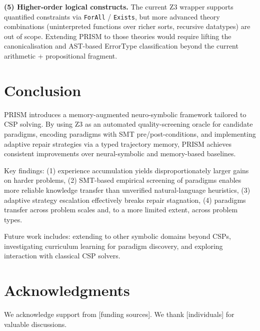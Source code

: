 \textbf{(5) Higher-order logical constructs.} The current Z3 wrapper supports quantified constraints via \texttt{ForAll} / \texttt{Exists}, but more advanced theory combinations (uninterpreted functions over richer sorts, recursive datatypes) are out of scope. Extending PRISM to those theories would require lifting the canonicalisation and AST-based ErrorType classification beyond the current arithmetic + propositional fragment.


\section{Conclusion}

PRISM introduces a memory-augmented neuro-symbolic framework tailored to CSP solving. By using Z3 as an automated quality-screening oracle for candidate paradigms, encoding paradigms with SMT pre/post-conditions, and implementing adaptive repair strategies via a typed trajectory memory, PRISM achieves consistent improvements over neural-symbolic and memory-based baselines.

Key findings: (1) experience accumulation yields disproportionately larger gains on harder problems, (2) SMT-based empirical screening of paradigms enables more reliable knowledge transfer than unverified natural-language heuristics, (3) adaptive strategy escalation effectively breaks repair stagnation, (4) paradigms transfer across problem scales and, to a more limited extent, across problem types.

Future work includes: extending to other symbolic domains beyond CSPs, investigating curriculum learning for paradigm discovery, and exploring interaction with classical CSP solvers.

\section*{Acknowledgments}

We acknowledge support from [funding sources]. We thank [individuals] for valuable discussions.

